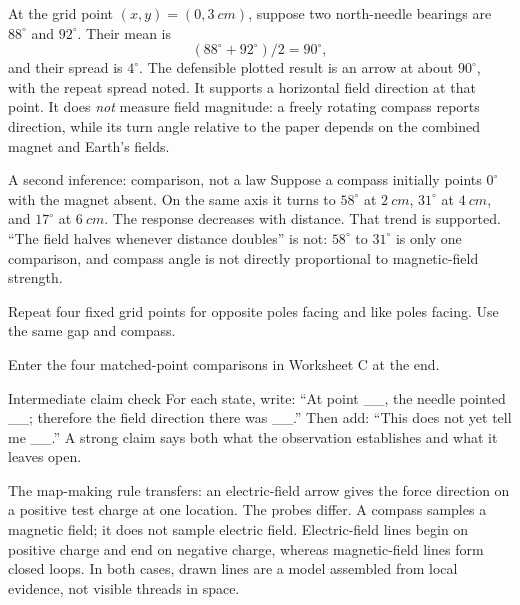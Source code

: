 \newpage
{}
\small
\mapstates

At the grid point \((x,y)=(0,\qty{3}{cm})\), suppose two north-needle bearings
are \(88^\circ\) and \(92^\circ\). Their mean is
\[
  (88^\circ+92^\circ)/2=90^\circ ,
\]
and their spread is \(4^\circ\). The defensible plotted result is an arrow at
about \(90^\circ\), with the repeat spread noted. It supports a horizontal
field direction at that point. It does \emph{not} measure field magnitude:
a freely rotating compass reports direction, while its turn angle relative to
the paper depends on the combined magnet and Earth's fields.

\begin{teloscard}{A second inference: comparison, not a law}
Suppose a compass initially points \(0^\circ\) with the magnet absent. On the
same axis it turns to \(58^\circ\) at \(\qty{2}{cm}\), \(31^\circ\) at
\(\qty{4}{cm}\), and \(17^\circ\) at \(\qty{6}{cm}\). The response decreases
with distance. That trend is supported. ``The field halves whenever distance
doubles'' is not: \(58^\circ\) to \(31^\circ\) is only one comparison, and
compass angle is not directly proportional to magnetic-field strength.
\end{teloscard}

Repeat four fixed grid points for opposite poles facing and like poles facing.
Use the same gap and compass.

Enter the four matched-point comparisons in Worksheet C at the end.

\begin{telospanel}{Intermediate claim check}
For each state, write: ``At point \_\_, the needle pointed \_\_; therefore the
field direction there was \_\_.'' Then add: ``This does not yet tell me
\_\_.'' A strong claim says both what the observation establishes and what it
leaves open.
\end{telospanel}

The map-making rule transfers: an electric-field arrow gives the force
direction on a positive test charge at one location. The probes differ.
A compass samples a magnetic field; it does not sample electric field.
Electric-field lines begin on positive charge and end on negative charge,
whereas magnetic-field lines form closed loops. In both cases, drawn lines are
a model assembled from local evidence, not visible threads in space.

